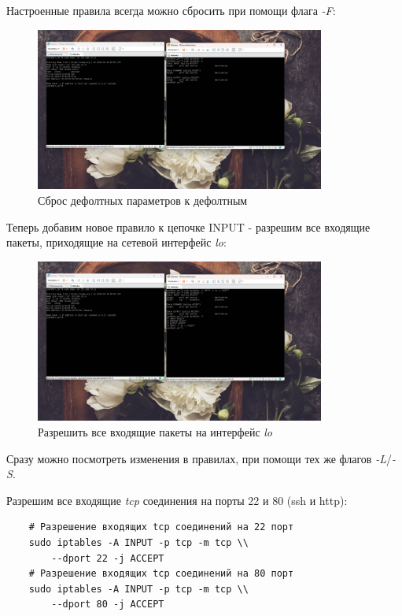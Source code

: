 \documentclass[a4paper]{article}
\begin{document}
  Настроенные правила всегда можно сбросить при помощи флага \textit{-F}:

  \begin{figure}[H]
    \centering
    \includegraphics[width=0.85\textwidth]{03_00 (41)}
    \caption{Сброс дефолтных параметров к дефолтным}
    \label{img:41}
  \end{figure}

  Теперь добавим новое правило к цепочке INPUT - разрешим все входящие пакеты,
  приходящие на сетевой интерфейс \textit{lo}:

  \begin{figure}[H]
    \centering
    \includegraphics[width=0.85\textwidth]{03_00 (43)}
    \caption{Разрешить все входящие пакеты на интерфейс \textit{lo}}
    \label{img:43}
  \end{figure}

  Сразу можно посмотреть изменения в правилах, при помощи тех же флагов \textit{-L}/\textit{-S}.

  Разрешим все входящие \textit{tcp} соединения на порты 22 и 80 (ssh и http):
  \begin{verbatim}
    # Разрешение входящих tcp соединений на 22 порт
    sudo iptables -A INPUT -p tcp -m tcp \\
        --dport 22 -j ACCEPT
    # Разрешение входящих tcp соединений на 80 порт
    sudo iptables -A INPUT -p tcp -m tcp \\
        --dport 80 -j ACCEPT
  \end{verbatim}
\end{document}
